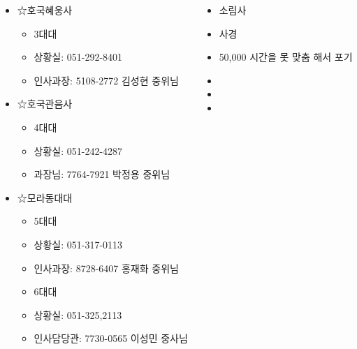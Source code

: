 \documentclass[	25pt, 
							a0paper, 
							portrait, %
							margin=0mm, %
							innermargin=10mm,  		%
							blockverticalspace=4mm, %
							colspace=5mm, 
							subcolspace=0mm
							]{tikzposter}
\begin{document}
\begin{columns}
{\begin{LARGE}
\begin{itemize}
			\item ☆호국혜웅사
				\begin{itemize}
				\item 3대대 
				\item 상황실: 051-292-8401
				\item 인사과장: 5108-2772 김성현 중위님
				\end{itemize}

			\item ☆호국관음사
				\begin{itemize}
				\item 4대대 
				\item 상황실: 051-242-4287
				\item 과장님: 7764-7921 박정용 중위님
				\end{itemize}

			\item ☆모라동대대
				\begin{itemize}
				\item 5대대
				\item 상황실: 051-317-0113
				\item 인사과장: 8728-6407 홍재화 중위님

				\item 6대대
				\item 상황실: 051-325,2113
				\item 인사담당관: 7730-0565 이성민 중사님 
				\end{itemize}

			\end{itemize}
			\end{LARGE}

		}



		{
			\setlength{\leftmargini}{7em}			
			\setlength{\labelsep}{1em} %
			\begin{LARGE}
			\begin{itemize}
			\item [이름] 소림사
			\item [내용] 사경
			\item [금액] 50,000 시간을 못 맞춤 해서 포기 
			\item [은행] 
			\item [계좌번호] 
			\item [예금주] 
			\end{itemize}
			\end{LARGE}
		}		





\end{columns}
\end{document}

